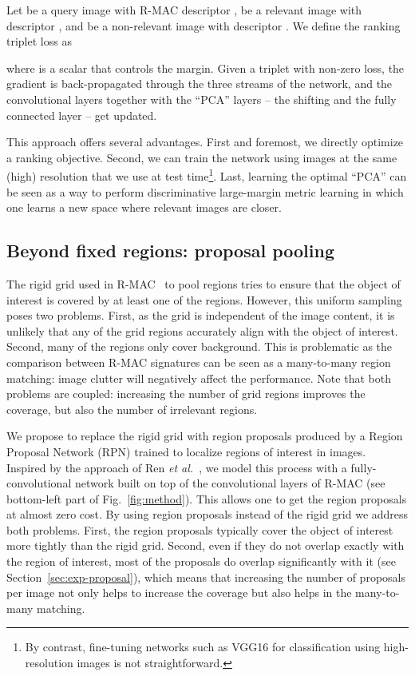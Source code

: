 \documentclass[runningheads]{llncs}
\def\etal{\emph{et al.}~}
\begin{document}
Let  be a query image with R-MAC descriptor ,  be a relevant image with descriptor , and  be a
non-relevant image with descriptor .
We define the ranking triplet loss as

where  is a scalar that controls the margin. 
Given a triplet with non-zero loss, the gradient is back-propagated through the three streams of the
network, and the convolutional layers together with the ``PCA'' layers -- the shifting and the fully connected layer -- get updated.

This approach offers several advantages. First and foremost, we directly optimize a ranking objective. Second, we can
train the network using images at the same (high) resolution that we use at test time\footnote{By contrast, fine-tuning
networks such as VGG16 for classification using high-resolution images is not straightforward.}. Last, learning the
optimal ``PCA'' can be seen as a way to perform discriminative large-margin metric learning \cite{Weinberger:2009} in
which one learns a new space where relevant images are closer.

\subsection{Beyond fixed regions: proposal pooling}
\label{sec:proposal}
The rigid grid used in R-MAC~\cite{Tolias2016} to pool regions tries to ensure that the object of interest is covered by at least one of the regions.
However, this uniform sampling poses two problems. First, as the grid is independent of the image content, it is
unlikely that any of the grid regions accurately align with the object of interest.
Second, many of the regions only cover background. This is problematic as the comparison between R-MAC signatures can be seen as a many-to-many region matching: image clutter will negatively affect the performance. Note that both problems are coupled: increasing the number of grid regions improves the coverage, but also the number of irrelevant regions.

We propose to replace the rigid grid with region proposals produced by a Region Proposal Network (RPN) 
trained to localize regions of interest in images. 
Inspired by the approach of Ren \etal\cite{Ren2015faster}, we model this process with a 
fully-convolutional network built on top of the convolutional layers of R-MAC (see bottom-left part of Fig.~\ref{fig:method}). 
This allows one to get the region proposals at almost zero cost.
By using region proposals instead of the rigid grid we address both problems.
First, the region proposals typically cover the object of interest more tightly than the rigid grid.
Second, even if they do not overlap exactly with the region of interest, most of the proposals do overlap significantly with it (see Section~\ref{sec:exp-proposal}), which means that increasing the number of proposals per image not only helps to increase the coverage but also helps in the many-to-many matching.
\end{document}
